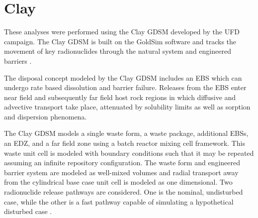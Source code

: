 
\section{Clay}

These analyses were performed using the Clay \gls{GDSM} developed by the 
\gls{UFD} campaign\cite{clayton_generic_2011}. The Clay \gls{GDSM} is built on the 
GoldSim software and tracks the movement of key radionuclides through the 
natural system and engineered barriers \cite{golder_goldsim_2010, 
golder_goldsim_ct_2010}.

The disposal concept modeled by the Clay \gls{GDSM} includes an \gls{EBS} which 
can undergo rate based dissolution and barrier failure. Releases from the \gls{EBS} enter 
near field and subsequently far field host rock regions in which diffusive and 
advective transport take place, attenuated by solubility limits as well as 
sorption and dispersion phenomena.  

The Clay \gls{GDSM} models a single waste form, a waste package, additional 
\glspl{EBS}, 
an \gls{EDZ}, and a far field zone using a batch reactor mixing cell framework. This waste unit cell is modeled 
with boundary conditions such that it may be repeated assuming an infinite 
repository configuration. The waste form and engineered barrier system are modeled as well-mixed volumes 
and radial transport away from the cylindrical base case unit cell is modeled as  
one dimensional. Two radionuclide release pathways are considered. One is the nominal, 
undisturbed case, while the other is a fast pathway capable of simulating a 
hypothetical disturbed case 
\cite{clayton_generic_2011}.


